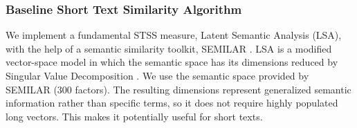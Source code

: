 \subsubsection{Baseline Short Text Similarity Algorithm}
We implement a fundamental STSS measure, Latent Semantic 
Analysis (LSA), with the help of a semantic similarity toolkit, 
SEMILAR \cite{rus2013semilar}. 
LSA is a modified vector-space model in which the semantic space has its 
dimensions reduced by 
Singular Value Decomposition \cite{deerwester1990indexing}.
We use the semantic space provided by SEMILAR (300 factors).
The resulting dimensions represent generalized 
semantic information rather than specific terms, so it does not require highly 
populated long vectors. This makes it potentially useful for short texts.




